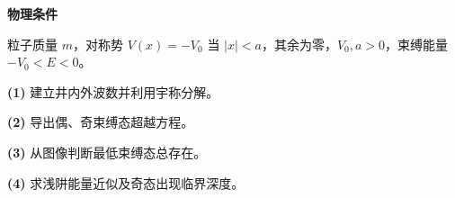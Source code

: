 \textbf{物理条件}\par 粒子质量 \(m\)，对称势 \(V(x)=-V_0\) 当 \(|x|<a\)，其余为零，\(V_0,a>0\)，束缚能量 \(-V_0<E<0\)。
\par\noindent\textbf{(1)} 建立井内外波数并利用宇称分解。
\par\noindent\textbf{(2)} 导出偶、奇束缚态超越方程。
\par\noindent\textbf{(3)} 从图像判断最低束缚态总存在。
\par\noindent\textbf{(4)} 求浅阱能量近似及奇态出现临界深度。
